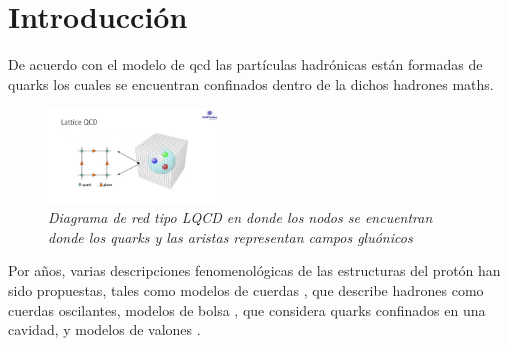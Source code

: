 \chapter*{Introducción}

\pagestyle{fancy}
\fancyhf{} %

% 

De acuerdo con el modelo de \acrfull{qcd} las partículas hadrónicas están formadas de quarks los cuales se encuentran confinados dentro de la dichos hadrones \Gls{maths}.

\renewcommand{\figurename}{Fig.}

\begin{figure}
\centering
\includegraphics[width=0.4\textwidth]{./Images/LQCD.jpg}
\caption[Red LQCD]{\emph{Diagrama de red tipo LQCD en donde los nodos se encuentran donde los quarks y las aristas representan campos gluónicos}}
\label{fig: LQCD}
\end{figure}

Por años, varias descripciones fenomenológicas de las estructuras del protón han sido propuestas, tales como modelos de cuerdas \cite{Artru1974, Andersson_1983} \cite{Artru1974, Andersson_1983}, que describe hadrones como cuerdas oscilantes, modelos de bolsa \cite{AIHPA_1968__8_2_163_0,DeTar_1983}, que considera quarks confinados en una cavidad, y modelos de valones \cite{Hwa_1981}.

